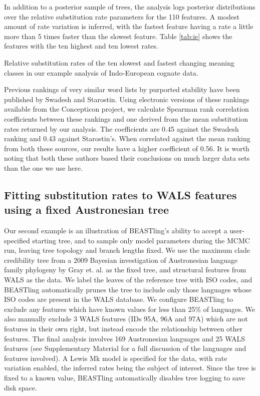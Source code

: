 \documentclass[twocolumn,10pt]{scrartcl}
\begin{document}
In addition to a posterior sample of trees, the analysis logs posterior distributions over the relative substitution rate parameters for the 110 features.  A modest amount of rate variation is inferred, with the fastest feature having a rate a little more than 5 times faster than the slowest feature.  Table \ref{tab:ie} shows the features with the ten highest and ten lowest rates.  
\begin{table}[t]
	\begin{center}
		
	\end{center}
	\caption{Relative substitution rates of the ten slowest and fastest changing meaning classes in our example analysis of Indo-European cognate data.}
\label{tab:ie}
\end{table}

Previous rankings of very similar word lists by purported stability have been published by Swadesh\cite{SWADESH} and Starostin\cite{Starostin2007}.  Using electronic versions of these rankings available from the Concepticon project\cite{List2015}, we calculate Spearman rank correlation coefficients between these rankings and one derived from the mean substitution rates returned by our analysis.  The coefficients are 0.45 against the Swadesh ranking and 0.43 against Starostin's.  When correlated against the mean ranking from both these sources, our results have a higher coefficient of 0.56.  It is worth noting that both these authors based their conclusions on much larger data sets than the one we use here.

\subsection{Fitting substitution rates to WALS features using a fixed Austronesian tree}

Our second example is an illustration of BEASTling's ability to accept a user-specified starting tree, and to sample only model parameters during the MCMC run, leaving tree topology and branch lengths fixed.  We use the maximum clade credibility tree from a 2009 Bayesian investigation of Austronesian language family phylogeny by Gray et. al.\cite{Gray2009} as the fixed tree, and structural features from WALS as the data.  We label the leaves of the reference tree with ISO codes, and BEASTling automatically prunes the tree to include only those languages whose ISO codes are present in the WALS database.  We configure BEASTling to exclude any features which have known values for less than 25\% of languages.  We also manually exclude 3 WALS features (IDs 95A, 96A and 97A) which are not features in their own right, but instead encode the relationship between other features.  The final analysis involves 169 Austronesian languages and 25 WALS features (see Supplementary Material for a full discussion of the languages and features involved).  A Lewis Mk model is specified for the data, with rate variation enabled, the inferred rates being the subject of interest.  Since the tree is fixed to a known value, BEASTling automatically disables tree logging to save disk space.
\end{document}

